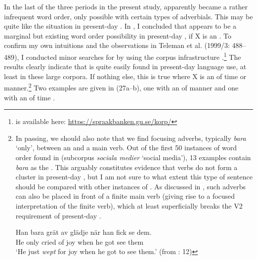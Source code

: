 \documentclass[output=paper, colorlinks, citecolor=brown]{langscibook}
\begin{document}
In the last of the three  periods in the present study,  apparently became a rather infrequent word order, only possible with certain types of adverbials. This may be quite like the situation in present-day . In , I concluded that  appears to be a marginal but existing word order possibility in present-day , if X is an . To confirm my own intuitions and the observations in Teleman et al. (1999/3: 488–489), I conducted minor searches for  by using the  corpus infrastructure  \citep{BorinEtAl2012}.\footnote{ is available here: \url{https://spraakbanken.gu.se/korp/}}  The results clearly indicate that  is quite easily found in present-day language use, at least in these large corpora. If nothing else, this is true where X is an  of time or manner.{\footnote{In passing, we should also note that we find focusing adverbs, typically \textit{bara} ‘only’, between an  and a main verb. Out of the first 50 instances of  word order found in  (subcorpus \textit{sociala medier} ‘social media’), 13 examples contain \textit{bara} as the . This arguably constitutes evidence that verbs do not form a cluster in present-day , but I am not sure to what extent this type of sentence should be compared with other instances of . As discussed in \citet{BrandtlerHakansson2017}, such adverbs can also be placed in front of a finite main verb (giving rise to a focused interpretation of the finite verb), which at least superficially breaks the V2 requirement of present-day .   

\ea
\gll  Han  bara  grät  av  glädje  när  han  fick  se  dem.\\
      He  only  cried  of  joy  when  he  got  see  them\\
\glt ‘He just \textit{wept} for joy when he got to see them.’ (from \citealt{BrandtlerHakansson2017}: 12)
\z}} Two examples are given in (27a–b), one with an  of manner  and one with an  of time .
\end{document}
